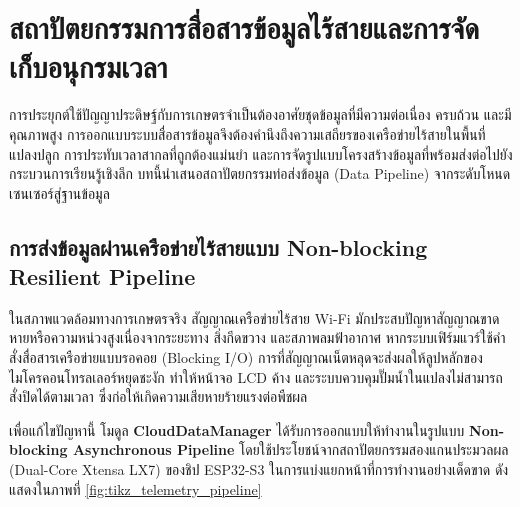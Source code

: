 \chapter{สถาปัตยกรรมการสื่อสารข้อมูลไร้สายและการจัดเก็บอนุกรมเวลา}
\label{chap:telemetry}

การประยุกต์ใช้ปัญญาประดิษฐ์กับการเกษตรจำเป็นต้องอาศัยชุดข้อมูลที่มีความต่อเนื่อง ครบถ้วน และมีคุณภาพสูง การออกแบบระบบสื่อสารข้อมูลจึงต้องคำนึงถึงความเสถียรของเครือข่ายไร้สายในพื้นที่แปลงปลูก การประทับเวลาสากลที่ถูกต้องแม่นยำ และการจัดรูปแบบโครงสร้างข้อมูลที่พร้อมส่งต่อไปยังกระบวนการเรียนรู้เชิงลึก บทนี้นำเสนอสถาปัตยกรรมท่อส่งข้อมูล (Data Pipeline) จากระดับโหนดเซนเซอร์สู่ฐานข้อมูล

\section{การส่งข้อมูลผ่านเครือข่ายไร้สายแบบ Non-blocking Resilient Pipeline}

ในสภาพแวดล้อมทางการเกษตรจริง สัญญาณเครือข่ายไร้สาย Wi-Fi มักประสบปัญหาสัญญาณขาดหายหรือความหน่วงสูงเนื่องจากระยะทาง สิ่งกีดขวาง และสภาพลมฟ้าอากาศ หากระบบเฟิร์มแวร์ใช้คำสั่งสื่อสารเครือข่ายแบบรอคอย (Blocking I/O) การที่สัญญาณเน็ตหลุดจะส่งผลให้ลูปหลักของไมโครคอนโทรลเลอร์หยุดชะงัก ทำให้หน้าจอ LCD ค้าง และระบบควบคุมปั๊มน้ำในแปลงไม่สามารถสั่งปิดได้ตามเวลา ซึ่งก่อให้เกิดความเสียหายร้ายแรงต่อพืชผล

เพื่อแก้ไขปัญหานี้ โมดูล \textbf{CloudDataManager} ได้รับการออกแบบให้ทำงานในรูปแบบ \textbf{Non-blocking Asynchronous Pipeline} โดยใช้ประโยชน์จากสถาปัตยกรรมสองแกนประมวลผล (Dual-Core Xtensa LX7) ของชิป ESP32-S3 ในการแบ่งแยกหน้าที่การทำงานอย่างเด็ดขาด ดังแสดงในภาพที่ \ref{fig:tikz_telemetry_pipeline}

